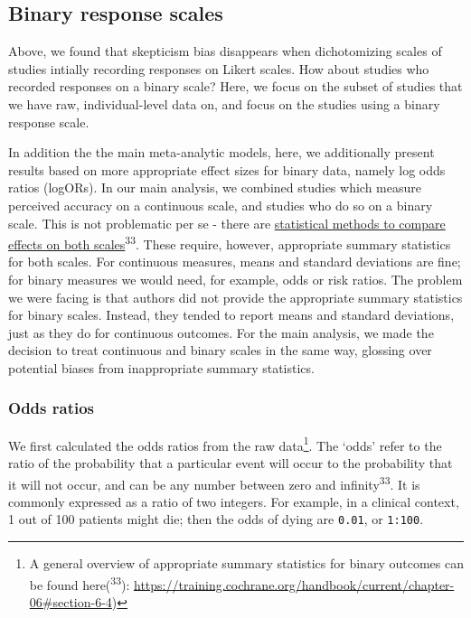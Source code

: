 \documentclass[
  man]{apa6}
\begin{document}
\subsection{Binary response scales}\label{binary-response-scales}

Above, we found that skepticism bias disappears when dichotomizing scales of studies intially recording responses on Likert scales. How about studies who recorded responses on a binary scale? Here, we focus on the subset of studies that we have raw, individual-level data on, and focus on the studies using a binary response scale.

In addition the the main meta-analytic models, here, we additionally present results based on more appropriate effect sizes for binary data, namely log odds ratios (logORs). In our main analysis, we combined studies which measure perceived accuracy on a continuous scale, and studies who do so on a binary scale. This is not problematic per se - there are \href{https://training.cochrane.org/handbook/current/chapter-10\#section-10-6}{statistical methods to compare effects on both scales}\textsuperscript{33}. These require, however, appropriate summary statistics for both scales. For continuous measures, means and standard deviations are fine; for binary measures we would need, for example, odds or risk ratios. The problem we were facing is that authors did not provide the appropriate summary statistics for binary scales. Instead, they tended to report means and standard deviations, just as they do for continuous outcomes. For the main analysis, we made the decision to treat continuous and binary scales in the same way, glossing over potential biases from inappropriate summary statistics.

\subsubsection{Odds ratios}\label{odds-ratios}

We first calculated the odds ratios from the raw data\footnote{A general overview of appropriate summary statistics for binary outcomes can be found here(\textsuperscript{33}): \url{https://training.cochrane.org/handbook/current/chapter-06\#section-6-4})}. The `odds' refer to the ratio of the probability that a particular event will occur to the probability that it will not occur, and can be any number between zero and infinity\textsuperscript{33}. It is commonly expressed as a ratio of two integers. For example, in a clinical context, 1 out of 100 patients might die; then the odds of dying are \texttt{0.01}, or \texttt{1:100}.
\end{document}
